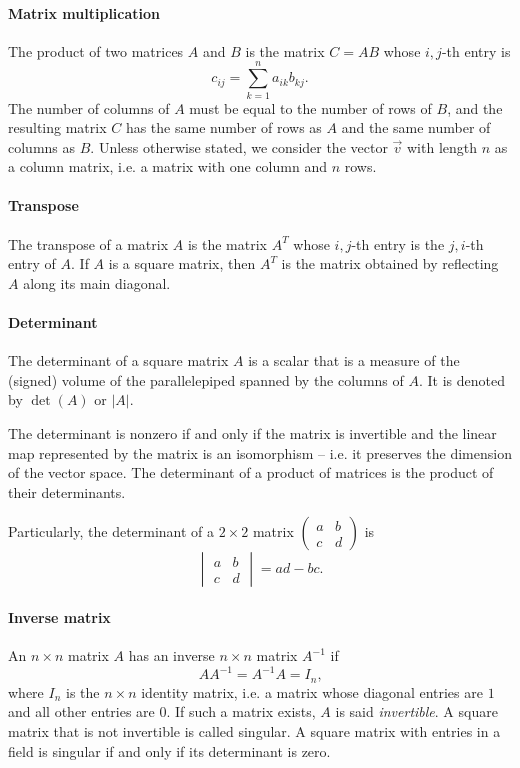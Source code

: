 \paragraph{Matrix multiplication}  The product of two matrices $A$ and $B$ is the matrix
$C = A B$ whose $i, j$-th entry is $$c_{ij} = \sum_{k = 1}^n a_{ik} b_{kj}\text{.}$$
The number of columns of $A$ must be equal to the number of rows of $B$, and the
resulting matrix $C$ has the same number of rows as $A$ and the same number of columns as $B$.
Unless otherwise stated, we consider the vector $\vec{v}$ with length $n$ as a column
matrix, i.e. a matrix with one column and $n$ rows.

\paragraph{Transpose}  The transpose of a matrix $A$ is the matrix $A^T$ whose $i, j$-th
entry is the $j, i$-th entry of $A$.  If $A$ is a square matrix, then $A^T$ is the
matrix obtained by reflecting $A$ along its main diagonal.

\paragraph{Determinant}  The determinant of a square matrix $A$ is a scalar that is a
measure of the (signed) volume of the parallelepiped spanned by the columns of $A$.  It is
denoted by $\det(A)$ or $|A|$.

The determinant is nonzero if and only if the matrix is invertible and the linear map
represented by the matrix is an isomorphism -- i.e. it preserves the dimension of the
vector space.  The determinant of a product of matrices is the product of their
determinants.

Particularly, the determinant of a $2 \times 2$ matrix $\begin{pmatrix} a & b \\ c & d
\end{pmatrix}$ is $$\begin{vmatrix} a & b \\ c & d \end{vmatrix} = ad - bc\text{.}$$

\paragraph{Inverse matrix}  An $n \times n$ matrix $A$ has an inverse $n \times n$ matrix
$A^{-1}$ if
\[
  A A^{-1} = A^{-1} A = I_n\text{,}
\]
where $I_n$ is the $n \times n$ identity matrix, i.e. a matrix whose diagonal entries are
$1$ and all other entries are $0$. If such a matrix exists, $A$ is said
\emph{invertible}.  A square matrix that is not invertible is called singular. A square
matrix with entries in a field is singular if and only if its determinant is zero.

